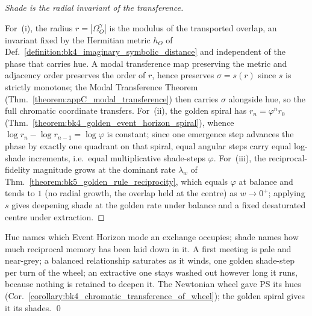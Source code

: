 \begin{proof}[Shade is the radial invariant of the transference]
\label{proof:bk5_shade_transfers}
\leavevmode

For~(i), the radius $r=|\Omega_O^\gamma|$ is the modulus of the transported overlap,
an invariant fixed by the Hermitian metric $h_O$ of
Def.~\ref{definition:bk4_imaginary_symbolic_distance} and independent of the phase
that carries hue. A modal transference map preserving the metric and adjacency order
preserves the order of $r$, hence preserves $\sigma=s(r)$ since $s$ is strictly
monotone; the Modal Transference Theorem
(Thm.~\ref{theorem:appC_modal_transference}) then carries $\sigma$ alongside hue, so
the full chromatic coordinate transfers. For~(ii), the golden spiral has
$r_n=\varphi^{n}r_0$ (Thm.~\ref{theorem:bk4_golden_event_horizon_spiral}), whence
$\log r_n-\log r_{n-1}=\log\varphi$ is constant; since one emergence step advances the
phase by exactly one quadrant on that spiral, equal angular steps carry equal
log-shade increments, i.e.\ equal multiplicative shade-steps $\varphi$. For~(iii), the
reciprocal-fidelity magnitude grows at the dominant rate $\lambda_w$ of
Thm.~\ref{theorem:bk5_golden_rule_reciprocity}, which equals $\varphi$ at balance and
tends to $1$ (no radial growth, the overlap held at the centre) as $w\to 0^{+}$;
applying $s$ gives deepening shade at the golden rate under balance and a fixed
desaturated centre under extraction.
\end{proof}

\begin{scholium}
\label{scholium:bk5_palette_of_a_relation}
Hue names which Event Horizon mode an exchange occupies; shade names how much
reciprocal memory has been laid down in it. A first meeting is pale and near-grey; a
balanced relationship saturates as it winds, one golden shade-step per turn of the
wheel; an extractive one stays washed out however long it runs, because nothing is
retained to deepen it. The Newtonian wheel gave PS its hues
(Cor.~\ref{corollary:bk4_chromatic_transference_of_wheel}); the golden spiral gives it
its shades. \qed
\end{scholium}

